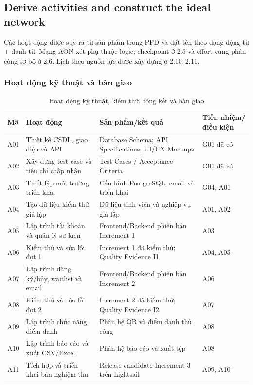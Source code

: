 \documentclass{article}
\begin{document}
\begin{landscape}
\subsection{Derive activities and construct the ideal network}
Các hoạt động được suy ra từ sản phẩm trong PFD và đặt tên theo dạng động từ + danh từ. Mạng AON xét phụ thuộc logic; checkpoint ở 2.5 và effort cùng phân công sơ bộ ở 2.6. Lịch theo nguồn lực được xây dựng ở 2.10--2.11.
\subsubsection{Hoạt động kỹ thuật và bàn giao}
\begin{table}[H]
\centering
\caption{Hoạt động kỹ thuật, kiểm thử, tổng kết và bàn giao}
\small
\renewcommand{\arraystretch}{1.25}
\begin{tabularx}{\linewidth}{|p{1.2cm}|X|p{8cm}|p{4.2cm}|}
\hline
\textbf{Mã} & \textbf{Hoạt động} & \textbf{Sản phẩm/kết quả} & \textbf{Tiền nhiệm/điều kiện} \\ \hline
A01 & Thiết kế CSDL, giao diện và API & Database Schema; API Specifications; UI/UX Mockups & G01 đã có \\ \hline
A02 & Xây dựng test case và tiêu chí chấp nhận & Test Cases / Acceptance Criteria & G01 đã có \\ \hline
A03 & Thiết lập môi trường triển khai & Cấu hình PostgreSQL, email và triển khai & G04, A01 \\ \hline
A04 & Tạo dữ liệu kiểm thử giả lập & Dữ liệu sinh viên và nghiệp vụ giả lập & A01, A02 \\ \hline
A05 & Lập trình tài khoản và quản lý sự kiện & Frontend/Backend phiên bản Increment 1 & A03 \\ \hline
A06 & Kiểm thử và sửa lỗi đợt 1 & Increment 1 đã kiểm thử; Quality Evidence I1 & A04, A05 \\ \hline
A07 & Lập trình đăng ký/hủy, waitlist và email & Frontend/Backend phiên bản Increment 2 & A06 \\ \hline
A08 & Kiểm thử và sửa lỗi đợt 2 & Increment 2 đã kiểm thử; Quality Evidence I2 & A07 \\ \hline
A09 & Lập trình chức năng điểm danh & Phân hệ QR và điểm danh thủ công & A08 \\ \hline
A10 & Lập trình báo cáo và xuất CSV/Excel & Phân hệ báo cáo và xuất tệp & A08 \\ \hline
A11 & Tích hợp và triển khai bản nghiệm thu & Release candidate Increment 3 trên Lightsail & A09, A10 \\ \hline

\end{tabularx}
\end{table}
\end{landscape}
\end{document}
